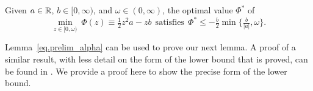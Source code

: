 \begin{lemma}\label{eq.prelim_alpha}
  Given $a \in \mathbb{R}$, $b \in [0,\infty)$, and $\omega \in (0,\infty)$, the optimal value $\Phi^*$ of
  \begin{equation*}
    \min_{z \in [0,\omega)}\ \Phi(z) \equiv \tfrac{1}{2} z^2 a - z b\ \ \text{satisfies}\ \ \Phi^* \leq -\tfrac{b}{2} \min \{\tfrac{b}{|a|}, \omega\}.
  \end{equation*}
\end{lemma}

Lemma~\ref{eq.prelim_alpha} can be used to prove our next lemma.  A proof of a similar result, with less detail on the form of the lower bound that is proved, can be found in \cite{curtis2010matrix}.  We provide a proof here to show the precise form of the lower bound.

